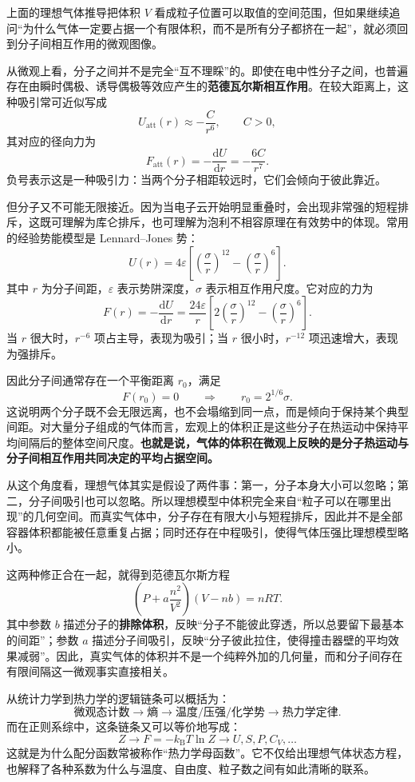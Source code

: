 \documentclass[UTF8]{ctexbook}
\begin{document}
上面的理想气体推导把体积 \(V\) 看成粒子位置可以取值的空间范围，但如果继续追问“为什么气体一定要占据一个有限体积，而不是所有分子都挤在一起”，就必须回到分子间相互作用的微观图像。

从微观上看，分子之间并不是完全“互不理睬”的。即使在电中性分子之间，也普遍存在由瞬时偶极、诱导偶极等效应产生的\textbf{范德瓦尔斯相互作用}。在较大距离上，这种吸引常可近似写成
\[
U_{\mathrm{att}}(r)\approx -\frac{C}{r^6},
\qquad C>0,
\]
其对应的径向力为
\[
F_{\mathrm{att}}(r)=-\frac{\mathrm dU}{\mathrm dr}=-\frac{6C}{r^7}.
\]
负号表示这是一种吸引力：当两个分子相距较远时，它们会倾向于彼此靠近。

但分子又不可能无限接近。因为当电子云开始明显重叠时，会出现非常强的短程排斥，这既可理解为库仑排斥，也可理解为泡利不相容原理在有效势中的体现。常用的经验势能模型是 Lennard--Jones 势：
\[
U(r)=4\varepsilon\left[\left(\frac{\sigma}{r}\right)^{12}-\left(\frac{\sigma}{r}\right)^6\right].
\]
其中 \(r\) 为分子间距，\(\varepsilon\) 表示势阱深度，\(\sigma\) 表示相互作用尺度。它对应的力为
\[
F(r)=-\frac{\mathrm dU}{\mathrm dr}
=\frac{24\varepsilon}{r}\left[2\left(\frac{\sigma}{r}\right)^{12}-\left(\frac{\sigma}{r}\right)^6\right].
\]
当 \(r\) 很大时，\(r^{-6}\) 项占主导，表现为吸引；当 \(r\) 很小时，\(r^{-12}\) 项迅速增大，表现为强排斥。

因此分子间通常存在一个平衡距离 \(r_0\)，满足
\[
F(r_0)=0
\qquad\Longrightarrow\qquad
r_0=2^{1/6}\sigma.
\]
这说明两个分子既不会无限远离，也不会塌缩到同一点，而是倾向于保持某个典型间距。对大量分子组成的气体而言，宏观上的体积正是这些分子在热运动中保持平均间隔后的整体空间尺度。\textbf{也就是说，气体的体积在微观上反映的是分子热运动与分子间相互作用共同决定的平均占据空间。}

从这个角度看，理想气体其实是假设了两件事：第一，分子本身大小可以忽略；第二，分子间吸引也可以忽略。所以理想模型中体积完全来自“粒子可以在哪里出现”的几何空间。而真实气体中，分子存在有限大小与短程排斥，因此并不是全部容器体积都能被任意重复占据；同时还存在中程吸引，使得气体压强比理想模型略小。

这两种修正合在一起，就得到范德瓦尔斯方程
\[
\left(P+a\frac{n^2}{V^2}\right)(V-nb)=nRT.
\]
其中参数 \(b\) 描述分子的\textbf{排除体积}，反映“分子不能彼此穿透，所以总要留下最基本的间距”；参数 \(a\) 描述分子间吸引，反映“分子彼此拉住，使得撞击器壁的平均效果减弱”。因此，真实气体的体积并不是一个纯粹外加的几何量，而和分子间存在有限间隔这一微观事实直接相关。

从统计力学到热力学的逻辑链条可以概括为：
\[
\text{微观态计数} \longrightarrow \text{熵} \longrightarrow \text{温度/压强/化学势} \longrightarrow \text{热力学定律}.
\]
而在正则系综中，这条链条又可以等价地写成：
\[
Z \longrightarrow F=-k_{\mathrm B}T\ln Z \longrightarrow U,S,P,C_V,\dots
\]
这就是为什么配分函数常被称作“热力学母函数”。它不仅给出理想气体状态方程，也解释了各种系数为什么与温度、自由度、粒子数之间有如此清晰的联系。
\end{document}
